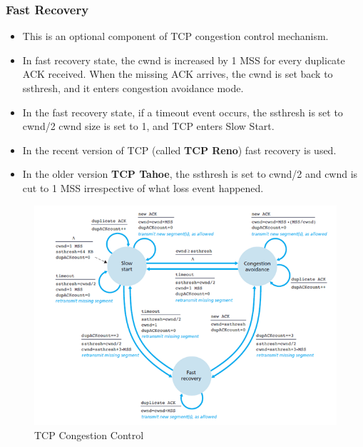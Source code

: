 \documentclass{article}
\theoremstyle{plain}
\theoremstyle{definition}
\begin{document}
\subsubsection{Fast Recovery}
\begin{itemize}
    \item This is an optional component of TCP congestion control mechanism. 
    
    \item In fast recovery state, the cwnd is increased by 1 MSS for every duplicate ACK received. When the missing ACK arrives, the cwnd is set back to ssthresh, and it enters congestion avoidance mode. 
    
    \item In the fast recovery state, if a timeout event occurs, the ssthresh is set to cwnd/2 cwnd size is set to 1, and TCP enters Slow Start. 
    
    \item In the recent version of TCP (called \textbf{TCP Reno}) fast recovery is used. 
    
    \item In the older version \textbf{TCP Tahoe}, the ssthresh is set to cwnd/2 and cwnd is cut to 1 MSS irrespective of what loss event happened. 
\end{itemize}

\begin{figure}
    \centering
    \includegraphics[scale=0.9]{cn8.png}
    \caption{TCP Congestion Control}
    \label{fig:my_label_15}
\end{figure}
\end{document}
